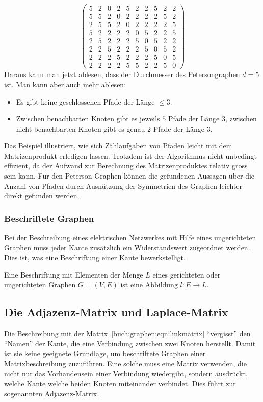 \begin{beispiel}
\[\begin{pmatrix}
 5& 2& 0& 2& 5& 2& 2& 5& 2& 2\\
 5& 5& 2& 0& 2& 2& 2& 2& 5& 2\\
 2& 5& 5& 2& 0& 2& 2& 2& 2& 5\\
 5& 2& 2& 2& 2& 0& 5& 2& 2& 5\\
 2& 5& 2& 2& 2& 5& 0& 5& 2& 2\\
 2& 2& 5& 2& 2& 2& 5& 0& 5& 2\\
 2& 2& 2& 5& 2& 2& 2& 5& 0& 5\\
 2& 2& 2& 2& 5& 5& 2& 2& 5& 0
\end{pmatrix}
\]
Daraus kann man jetzt ablesen, dass der Durchmesser des Petersongraphen
$d=5$ ist.
Man kann aber auch mehr ablesen:
\begin{itemize}
\item
Es gibt keine geschlossenen Pfade der Länge $\le 3$.
\item
Zwischen benachbarten Knoten gibt es jeweils $5$ Pfade der Länge $3$,
zwischen nicht benachbarten Knoten gibt es genau $2$ Pfade der Länge $3$.
\qedhere
\end{itemize}
\end{beispiel}

Das Beispiel illustriert, wie sich Zählaufgaben von Pfaden leicht mit dem
Matrizenprodukt erledigen lassen.
Trotzdem ist der Algorithmus nicht unbedingt effizient, da der Aufwand
zur Berechnung des Matrizenproduktes relativ gross sein kann.
Für den Peterson-Graphen können die gefundenen Aussagen über die Anzahl
von Pfaden durch Ausnützung der Symmetrien des Graphen leichter direkt
gefunden werden.

\subsubsection{Beschriftete Graphen}
Bei der Beschreibung eines elektrischen Netzwerkes mit Hilfe eines
ungerichteten Graphen muss jeder Kante zusätzlich ein Widerstandswert
zugeordnet werden.
Dies ist, was eine Beschriftung einer Kante bewerkstelligt.

\begin{definition}
Eine Beschriftung mit Elementen der Menge $L$
eines gerichteten oder ungerichteten Graphen $G=(V,E)$ 
ist eine Abbildung $l\colon E\to L$.
\end{definition}

\subsection{Die Adjazenz-Matrix und Laplace-Matrix
\label{subsection:adjazenz-und-laplace-matrix}}
Die Beschreibung mit der Matrix~\eqref{buch:graphen:eqn:linkmatrix}
``vergisst'' den ``Namen'' der Kante, die eine Verbindung zwischen zwei
Knoten herstellt.
Damit ist sie keine geeignete Grundlage, um beschriftete Graphen einer
Matrixbeschreibung zuzuführen.
Eine solche muss eine Matrix verwenden, die nicht nur das Vorhandensein einer
Verbindung wiedergibt, sondern ausdrückt, welche Kante welche beiden
Knoten miteinander verbindet.
Dies führt zur sogenannten Adjazenz-Matrix.

